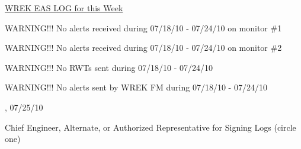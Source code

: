 \documentclass{article}
\begin{document}
\noindent \underline{WREK EAS LOG for this Week} 

\medskip

{\large{WARNING!!! No alerts received during 07/18/10 - 07/24/10 on monitor \#1}}

{\large{WARNING!!! No alerts received during 07/18/10 - 07/24/10 on monitor \#2}}

{\large{WARNING!!! No RWTs sent during 07/18/10 - 07/24/10 }}

{\large{WARNING!!! No alerts sent by WREK FM during 07/18/10 - 07/24/10 }}


 \underline{\hspace{100 pt}}, 07/25/10

\medskip

{\large{Chief Engineer, Alternate, or Authorized  Representative for Signing Logs \newline (circle one)}} 

\medskip

 \noindent 

\medskip
\end{document}
